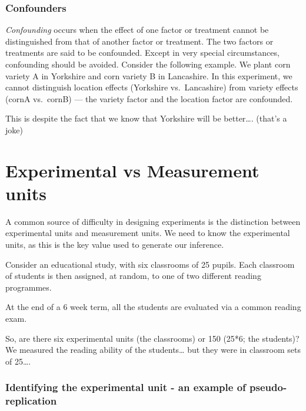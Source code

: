 \documentclass[
]{book}
\begin{document}
\hypertarget{confounders}{%
\subsubsection{Confounders}\label{confounders}}

\emph{Confounding} occurs when the effect of one factor or treatment cannot be distinguished from that of another factor or treatment. The two factors or treatments are said to be confounded. Except in very special circumstances, confounding should be avoided. Consider the following example. We plant corn variety A in Yorkshire and corn variety B in Lancashire. In this experiment, we cannot distinguish location effects (Yorkshire vs.~Lancashire) from variety effects (cornA vs.~cornB) --- the variety factor and the location factor are confounded.

This is despite the fact that we know that Yorkshire will be better\ldots. (that's a joke)

\hypertarget{experimental-vs-measurement-units}{%
\section{Experimental vs Measurement units}\label{experimental-vs-measurement-units}}

A common source of difficulty in designing experiments is the distinction between experimental units and measurement units. We need to know the experimental units, as this is the key value used to generate our inference.

Consider an educational study, with six classrooms of 25 pupils. Each classroom of students is then assigned, at random, to one of two different reading programmes.

At the end of a 6 week term, all the students are evaluated via a common reading exam.

So, are there six experimental units (the classrooms) or 150 (25*6; the students)? We measured the reading ability of the students\ldots{} but they were in classroom sets of 25\ldots.

\hypertarget{identifying-the-experimental-unit---an-example-of-pseudo-replication}{%
\subsubsection{\texorpdfstring{Identifying the experimental unit - an example of \textbf{pseudo-replication}}{Identifying the experimental unit - an example of pseudo-replication}}\label{identifying-the-experimental-unit---an-example-of-pseudo-replication}}
\end{document}
